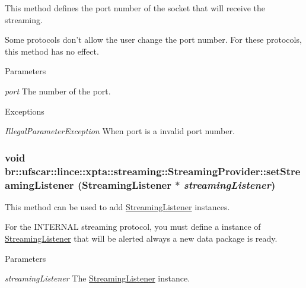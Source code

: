 This method defines the port number of the socket that will receive the streaming. 

Some protocols don't allow the user change the port number. For these protocols, this method has no effect. 
\begin{DoxyParams}{Parameters}
\item[{\em port}]The number of the port. \end{DoxyParams}

\begin{DoxyExceptions}{Exceptions}
\item[{\em IllegalParameterException}]When port is a invalid port number. \end{DoxyExceptions}
\hypertarget{classbr_1_1ufscar_1_1lince_1_1xpta_1_1streaming_1_1StreamingProvider_aba9b16a248950888bbade4fb80347933}{
\subsubsection[{setStreamingListener}]{\setlength{\rightskip}{0pt plus 5cm}void br::ufscar::lince::xpta::streaming::StreamingProvider::setStreamingListener ({\bf StreamingListener} $\ast$ {\em streamingListener})}}
\label{classbr_1_1ufscar_1_1lince_1_1xpta_1_1streaming_1_1StreamingProvider_aba9b16a248950888bbade4fb80347933}


This method can be used to add \hyperlink{classbr_1_1ufscar_1_1lince_1_1xpta_1_1streaming_1_1StreamingListener}{StreamingListener} instances. 

For the INTERNAL streaming protocol, you must define a instance of \hyperlink{classbr_1_1ufscar_1_1lince_1_1xpta_1_1streaming_1_1StreamingListener}{StreamingListener} that will be alerted always a new data package is ready. 
\begin{DoxyParams}{Parameters}
\item[{\em streamingListener}]The \hyperlink{classbr_1_1ufscar_1_1lince_1_1xpta_1_1streaming_1_1StreamingListener}{StreamingListener} instance. \end{DoxyParams}

